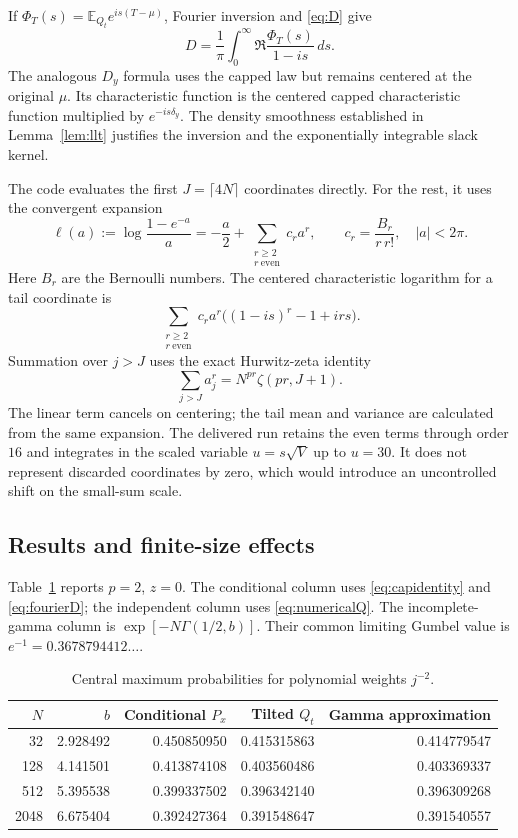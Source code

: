 \documentclass[11pt,a4paper]{article}
\numberwithin{equation}{section}
\theoremstyle{definition}
\theoremstyle{remark}
\newcommand{\E}{\mathbb E}
\begin{document}
If $\Phi_T(s)=\E_{Q_t}e^{is(T-\mu)}$, Fourier inversion and
\eqref{eq:D} give
\begin{equation}
 D=\frac1\pi\int_0^\infty
           \Re\frac{\Phi_T(s)}{1-is}\,ds. \label{eq:fourierD}
\end{equation}
The analogous $D_y$ formula uses the capped law but remains centered
at the original $\mu$. Its characteristic function is the centered
capped characteristic function multiplied by $e^{-is\delta_y}$.
The density smoothness established in Lemma~\ref{lem:llt} justifies
the inversion and the exponentially integrable slack kernel.

The code evaluates the first $J=\lceil4N\rceil$ coordinates directly.
For the rest, it uses the convergent expansion
\begin{equation}
 \ell(a):=\log\frac{1-e^{-a}}a
 =-\frac a2+\sum_{\substack{r\ge2\\r\ \mathrm{even}}}
       c_ra^r,\qquad c_r=\frac{B_r}{r\,r!},\quad |a|<2\pi.
 \label{eq:bernoullitail}
\end{equation}
Here $B_r$ are the Bernoulli numbers. The centered characteristic
logarithm for a tail coordinate is
\[
 \sum_{\substack{r\ge2\\r\ \mathrm{even}}}
 c_ra^r\big((1-is)^r-1+irs\big).
\]
Summation over $j>J$ uses the exact Hurwitz-zeta identity
\begin{equation}
 \sum_{j>J}a_j^r=N^{pr}\zeta(pr,J+1). \label{eq:zetatail}
\end{equation}
The linear term cancels on centering; the tail mean and variance are
calculated from the same expansion. The delivered run retains the even
terms through order $16$ and integrates in the scaled variable
$u=s\sqrt V$ up to $u=30$. It does not represent discarded coordinates
by zero, which would introduce an uncontrolled shift on the small-sum
scale.

\subsection{Results and finite-size effects}
Table~\ref{tab:central} reports $p=2$, $z=0$. The conditional column
uses \eqref{eq:capidentity} and \eqref{eq:fourierD}; the independent
column uses \eqref{eq:numericalQ}. The incomplete-gamma column is
$\exp[-N\Gamma(1/2,b)]$. Their common limiting Gumbel value is
$e^{-1}=0.3678794412\ldots$.

\begin{table}[htbp]
\centering
\caption{Central maximum probabilities for polynomial weights $j^{-2}$.}
\label{tab:central}
\begin{tabular}{rrrrr}
\toprule
$N$ & $b$ & Conditional $P_x$ & Tilted $Q_t$ & Gamma approximation\\
\midrule
32   & 2.928492 & 0.450850950 & 0.415315863 & 0.414779547\\
128  & 4.141501 & 0.413874108 & 0.403560486 & 0.403369337\\
512  & 5.395538 & 0.399337502 & 0.396342140 & 0.396309268\\
2048 & 6.675404 & 0.392427364 & 0.391548647 & 0.391540557\\
\bottomrule
\end{tabular}
\end{table}
\end{document}
